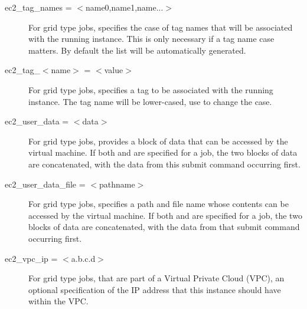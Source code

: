 \begin{description}

\label{condor-submit-ec2-tag-names}
\item[ec2\_tag\_names = $<$name0,name1,name...$>$]
For grid type  jobs, 
specifies the case of tag names that will be associated with the
running instance.
This is only necessary if a tag name case matters.
By default the list will be automatically generated.


\item[ec2\_tag\_$<$name$>$ = $<$value$>$]
For grid type  jobs, 
specifies a tag to be associated with the running instance.
The tag name will be lower-cased, use  to
change the case.


\label{condor-submit-ec2-user-data}
\item[ec2\_user\_data = $<$data$>$]
For grid type  jobs, 
provides a block of data that can be accessed by the virtual machine.
If both  and 
 are specified for a job,
the two blocks of data are concatenated, 
with the data from this  submit command 
occurring first.


\label{condor-submit-ec2-user-data-file}
\item[ec2\_user\_data\_file = $<$pathname$>$]
For grid type  jobs, 
specifies a path and file name whose contents can be 
accessed by the virtual machine.
If both  and 
 are specified for a job,
the two blocks of data are concatenated, 
with the data from that  submit command 
occurring first.


\label{condor-submit-ec2-vpc-ip}
\item[ec2\_vpc\_ip = $<$a.b.c.d$>$]
For grid type  jobs, 
that are part of a Virtual Private Cloud (VPC),
an optional specification of the IP address that this instance should have 
within the VPC.


\end{description}
